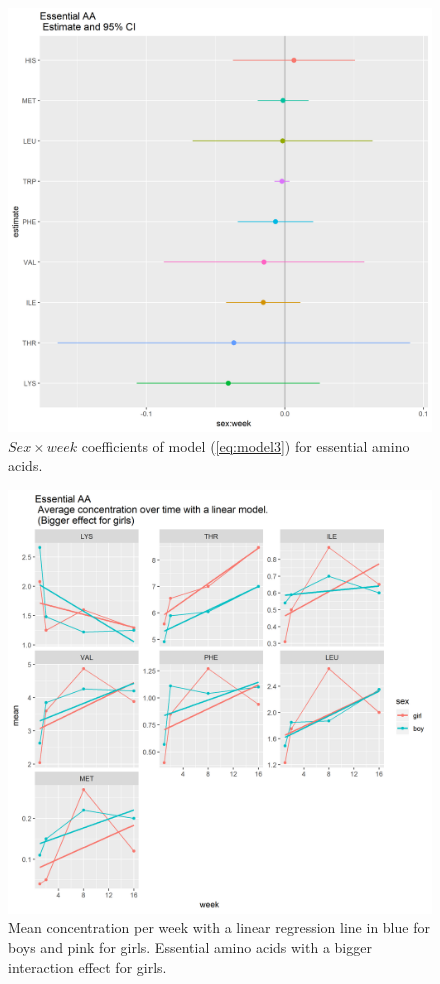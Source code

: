 \documentclass[12pt]{article}
\begin{document}
\begin{figure}[H]
  \includegraphics[width= \textwidth]{../sexweek/EAA_SW_SW_coeff.png}
  \caption{$Sex \times week$ coefficients of model (\ref{eq:model3}) for essential amino acids.}
  \label{fig:EAA_SW_SW_coeff}
\end{figure}


\begin{figure}[H]
  \centering
  \includegraphics[width=\textwidth]{../sexweek/EAA_girls.png}
  \caption{Mean concentration per week with a linear regression line in blue for boys and pink for girls. Essential amino acids with a bigger interaction effect for girls.}
  \label{fig:EAA_girls}
\end{figure}
\end{document}
